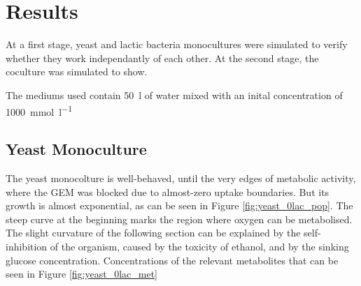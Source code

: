 \section{Results}\label{sec:results}
	At a first stage, yeast and lactic bacteria monocultures were simulated to verify whether they work independantly of each other.
	At the second stage, the coculture was simulated to show.
	
	The mediums used contain \SI{50}{\litre} of water mixed with an inital concentration of \SI{1000}{\milli\mole\per\litre}
	\subsection{Yeast Monoculture}
		The yeast monocolture is well-behaved, until the very edges of metabolic activity, where the GEM was blocked due to almost-zero uptake boundaries.
		But its growth is almost exponential, as can be seen in Figure \ref{fig:yeast_0lac_pop}.
		The steep curve at the beginning marks the region where oxygen can be metabolised.
		The slight curvature of the following section can be explained by the self-inhibition of the organism,
		caused by the toxicity of ethanol, and by the sinking glucose concentration.
		Concentrations of the relevant metabolites that can be seen in Figure \ref{fig:yeast_0lac_met}
		
